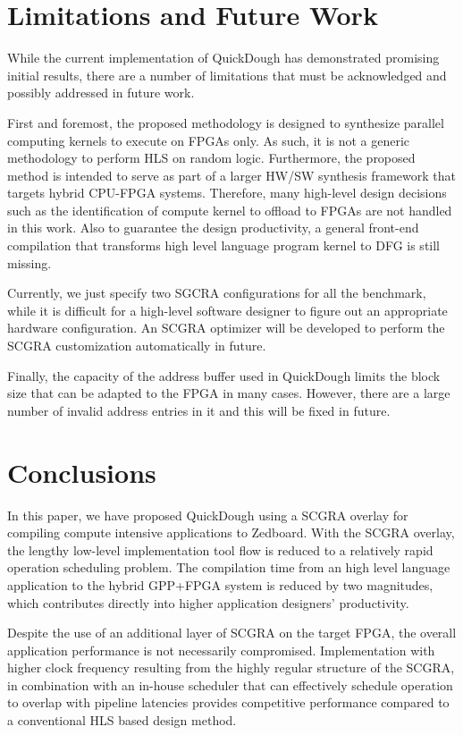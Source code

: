\section{Limitations and Future Work}\label{sec:discussion}
While the current implementation of QuickDough has demonstrated promising initial results, there are a number of limitations that must be acknowledged and possibly addressed in future work.

First and foremost, the proposed methodology is designed to synthesize parallel computing kernels to execute on FPGAs only. As such, it is not a generic methodology to perform HLS on random logic. Furthermore, the proposed method is intended to serve as part of a larger HW/SW synthesis framework that targets hybrid CPU-FPGA systems. Therefore, many high-level design decisions such as the identification of compute kernel to offload to FPGAs are not handled in this work. Also to guarantee the design productivity, a general front-end compilation that transforms high level language program kernel to DFG is still missing.

Currently, we just specify two SGCRA configurations for all the benchmark, while it is difficult for a high-level software designer to figure out an appropriate hardware configuration. An SCGRA optimizer will be developed to perform the SCGRA customization automatically in future.

Finally, the capacity of the address buffer used in QuickDough limits the block size that can be adapted to the FPGA in many cases. However, there are a large number of invalid address entries in it and this will be fixed in future. 

\section{Conclusions}\label{sec:conclusions}
In this paper, we have proposed QuickDough using a SCGRA overlay for compiling compute intensive applications to Zedboard. With the SCGRA overlay, the lengthy low-level implementation tool flow is reduced to a relatively rapid operation scheduling problem. The compilation time from an high level language application to the hybrid GPP+FPGA system is reduced by two magnitudes, which contributes directly into higher application designers' productivity.

Despite the use of an additional layer of SCGRA on the target FPGA, the overall application performance is not necessarily compromised. Implementation with higher clock frequency resulting from the highly regular structure of the SCGRA, in combination with an in-house scheduler that can effectively schedule operation to overlap with pipeline latencies provides competitive performance compared to a conventional HLS based design method.
